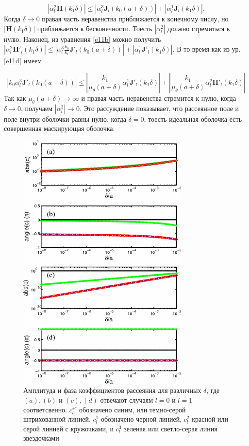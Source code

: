 \documentclass[a4paper, 12pt]{article}
\begin{document}

\begin{equation}\label{e12}
	\left| \alpha_l^2\mathbf{H}(k_1 \delta) \right| \le \left| \alpha_l^3 \mathbf{J}_l(k_0(a+\delta)) \right| + 
	\left| \alpha_l^1 \mathbf{J}_l(k_1 \delta) \right|. 
\end{equation}
Когда $\delta \to 0$ правая часть неравенства приближается к конечному числу, но $\left| \mathbf{H}(k_1 \delta) \right|$ 
приближается к бесконечности. Тоесть $\left| \alpha_l^2 \right|$ должно стремиться к нулю. Наконец, из уравнения 
\eqref{e11b} можно получить $\left| \alpha_l^2 \mathbf{H'}_l(k_1 \delta) \right| \le \left| \alpha_l^3 \frac{k_0}{k_1}
\mathbf{J'}_l(k_0(a+\delta))\right|+\left| \alpha_l^1\mathbf{J'}_l(k_1 \delta)\right|$. В то время как из ур. \eqref{e11d} 
имеем

\begin{equation}\label{e13}
	\left| k_0 \alpha_l^3 \mathbf{J'}_l(k_0(a+\delta))\right| \le
	\left| \frac{k_1}{\mu_\theta(a+\delta)}\alpha_l^1 \mathbf{J'}_l(k_1 \delta) \right| + 
	\left| \frac{k_1}{\mu_\theta(a+\delta)}\alpha_l^2 \mathbf{H'}_l(k_1 \delta) \right|
\end{equation}
Так как $\mu_\theta(a+\delta) \to \infty$ и правая часть неравенства стремится к нулю, когда $\delta \to 0$, получаем
$|\alpha_l^3| \to 0$. Это рассуждение показывает, что рассеянное поле и поле внутри оболочки равны нулю, когда $\delta=0$,
тоесть идеальная оболочка есть совершенная маскирующая оболочка.

\begin{figure}[t]
  \centering
  \includegraphics[height=0.3\paperheight, width=0.26\paperwidth]{3.png}
  \caption{Амплитуда и фаза коэффициентов рассеяния для различных $\delta$, где $(a),(b)$ и $(c),(d)$ отвечают случаям 
  $l=0$ и $l=1$ соответсвенно. $c_l^{sc}$ обозначено синим, или темно-серой штрихованной линией, $c_l^{1}$ обозначено
  черной линией, $c_l^2$ красной или серой линией с кружочками, и $c_l^3$ зеленая или светло-серая линия звездочками}
  \label{fig:3}
\end{figure}
\end{document}
